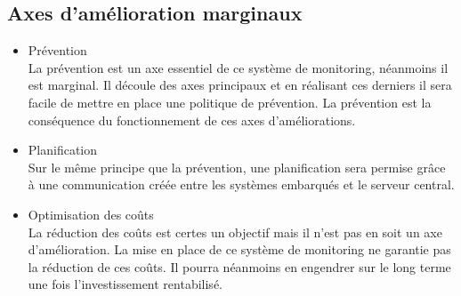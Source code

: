 \subsection{Axes d'amélioration marginaux}

\begin{itemize}
	\item Prévention \\

	La prévention est un axe essentiel de ce système de monitoring, néanmoins il est marginal. Il découle des axes principaux et en réalisant ces derniers il sera facile de mettre en place une politique de prévention. La prévention est la conséquence du fonctionnement de ces axes d'améliorations.

	\item Planification \\

	Sur le même principe que la prévention, une planification sera permise grâce à une communication créée entre les systèmes embarqués et le serveur central.

	\item Optimisation des coûts \\

		La réduction des coûts est certes un objectif mais il n'est pas en soit un axe d'amélioration. La mise en place de ce système de monitoring ne garantie pas la réduction de ces coûts. Il pourra néanmoins en engendrer sur le long terme une fois l'investissement rentabilisé.
	
\end{itemize}
